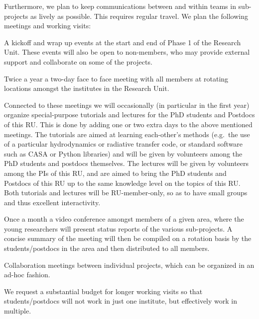 \documentclass[10pt,fleqn,twoside]{article}
\begin{document}
Furthermore, we plan to keep communications between and within teams in
sub-projects as lively as possible. This requires regular travel.
We plan the following meetings and working visits:
\begin{compactitemize}
\item A kickoff and wrap up events at the start and end of Phase 1 of the
  Research Unit. These events will also be open to non-members, who may
  provide external support and collaborate on some of the projects.
\item Twice a year a two-day face to face meeting with all members at
  rotating locations amongst the institutes in the Research Unit. 
\item Connected to these meetings we will occasionally (in particular in the
  first year) organize special-purpose tutorials and lectures for the PhD
  students and Postdocs of this RU. This is done by adding one or two extra
  days to the above mentioned meetings. The tutorials are aimed at learning
  each-other's methods (e.g.\ the use of a particular hydrodynamics or
  radiative transfer code, or standard software such as CASA or Python
  libraries) and will be given by volunteers among the PhD students and
  postdocs themselves. The lectures will be given by volunteers among the
  PIs of this RU, and are aimed to bring the PhD students and Postdocs of
  this RU up to the same knowledge level on the topics of this RU.  Both
  tutorials and lectures will be RU-member-only, so as to have small groups
  and thus excellent interactivity.
\item Once a month a video conference amongst members of a given area, where
  the young researchers will present status reports of the various
  sub-projects. A concise summary of the meeting will then be compiled on a
  rotation basis by the students/postdocs in the area and then distributed
  to all members.
\item Collaboration meetings between individual projects, which can be 
  organized in an ad-hoc fashion.
\item We request a substantial budget for longer working visits so that
  students/postdocs will not work in just one institute, but effectively
  work in multiple.
\end{compactitemize}


\end{document}
